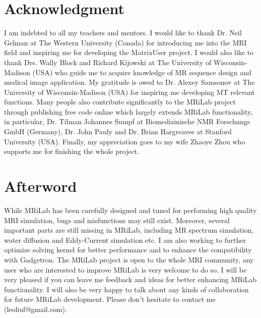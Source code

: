 \documentclass{book}%
\begin{document}
\backmatter

\chapter{Acknowledgment}

I am indebted to all my teachers and mentors. I would like to thank Dr. Neil Gelman at The Western University (Canada) for introducing me into the MRI field and inspiring me for developing the MatrixUser project. I would also like to thank Drs. Wally Block and Richard Kijowski at The University of Wisconsin-Madison (USA) who guide me to acquire knowledge of MR sequence design and medical image application. My gratitude is owed to Dr. Alexey Samsonov at The University of Wisconsin-Madison (USA) for inspiring me developing MT relevant functions. Many people also contribute significantly to the MRiLab project through publishing free code online which largely extends MRiLab functionality, in particular, Dr. Tilman Johannes Sumpf at Biomedizinische NMR Forschungs GmbH (Germany), Dr. John Pauly and Dr. Brian Hargreaves at Stanford University (USA). Finally, my appreciation goes to my wife Zhaoye Zhou who supports me for finishing the whole project.

\chapter{Afterword}

While MRiLab has been carefully designed and tuned for performing high quality MRI simulation, bugs and misfunctions may still exist. Moreover, several important parts are still missing in MRiLab, including MR spectrum simulation, water diffusion and Eddy-Current simulation etc. I am also working to further optimize solving kernel for better performance and to enhance the compatibility with Gadgetron. The MRiLab project is open to the whole MRI community, any user who are interested to improve MRiLab is very welcome to do so. I will be very pleased if you can leave me feedback and ideas for better enhancing MRiLab functionality. I will also be very happy to talk about any kinds of collaboration for future MRiLab development. Please don't hesitate to contact me (leoliuf@gmail.com).
\end{document}
